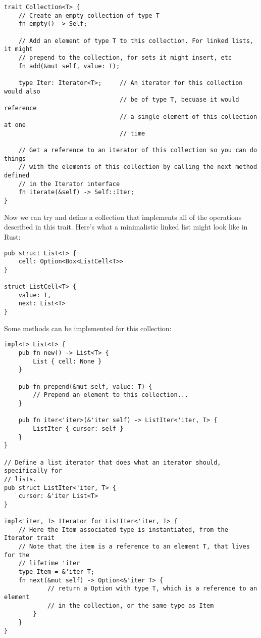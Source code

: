 \begin{lstlisting}[nolol]
trait Collection<T> {
    // Create an empty collection of type T
    fn empty() -> Self;

    // Add an element of type T to this collection. For linked lists, it might
    // prepend to the collection, for sets it might insert, etc
    fn add(&mut self, value: T);

    type Iter: Iterator<T>;     // An iterator for this collection would also
                                // be of type T, becuase it would reference
                                // a single element of this collection at one
                                // time

    // Get a reference to an iterator of this collection so you can do things
    // with the elements of this collection by calling the next method defined
    // in the Iterator interface
    fn iterate(&self) -> Self::Iter;
}
\end{lstlisting}

Now we can try and define a collection that implements all of the operations
described in this trait. Here's what a minimalistic linked list might look like
in Rust:

\begin{lstlisting}[nolol]
pub struct List<T> {
    cell: Option<Box<ListCell<T>>
}

struct ListCell<T> {
    value: T,
    next: List<T>
}
\end{lstlisting}

Some methods can be implemented for this collection:

\begin{lstlisting}[nolol]
impl<T> List<T> {
    pub fn new() -> List<T> {
        List { cell: None }
    }
    
    pub fn prepend(&mut self, value: T) {
        // Prepend an element to this collection...
    }
    
    pub fn iter<'iter>(&'iter self) -> ListIter<'iter, T> {
        ListIter { cursor: self }
    }
}

// Define a list iterator that does what an iterator should, specifically for
// lists.
pub struct ListIter<'iter, T> {
    cursor: &'iter List<T>
}

impl<'iter, T> Iterator for ListIter<'iter, T> {
    // Here the Item associated type is instantiated, from the Iterator trait
    // Note that the item is a reference to an element T, that lives for the
    // lifetime 'iter
    type Item = &'iter T;
    fn next(&mut self) -> Option<&'iter T> {
            // return a Option with type T, which is a reference to an element
            // in the collection, or the same type as Item
        }
    }
}
\end{lstlisting}

